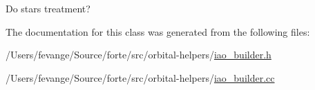 Do stars treatment? 



The documentation for this class was generated from the following files\+:\begin{DoxyCompactItemize}
\item 
/\+Users/fevange/\+Source/forte/src/orbital-\/helpers/\mbox{\hyperlink{iao__builder_8h}{iao\+\_\+builder.\+h}}\item 
/\+Users/fevange/\+Source/forte/src/orbital-\/helpers/\mbox{\hyperlink{iao__builder_8cc}{iao\+\_\+builder.\+cc}}\end{DoxyCompactItemize}
